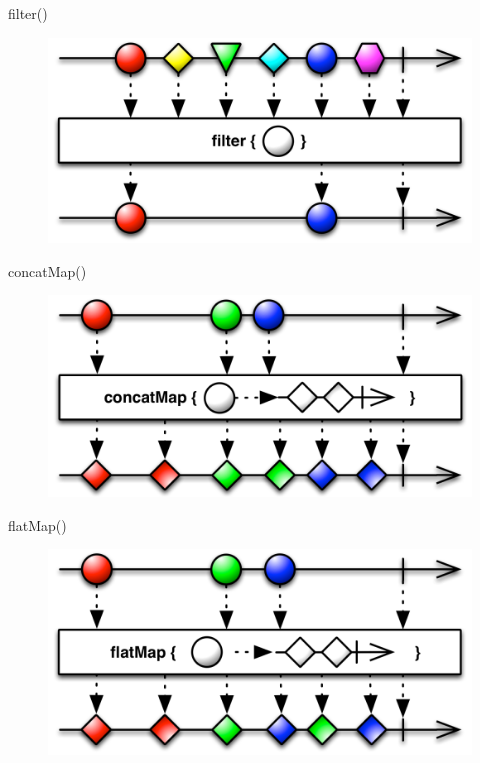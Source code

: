 \begin{frame}{filter()}
	\begin{figure}[h]
		\includegraphics[width=1.0\textwidth,page=1]{gfx/filter}
	\end{figure}
\end{frame}

\begin{frame}{concatMap()}
	\begin{figure}[h]
		\includegraphics[width=1.0\textwidth,page=1]{gfx/concatMap}
	\end{figure}
\end{frame}

\begin{frame}{flatMap()}
	\begin{figure}[h]
		\includegraphics[width=1.0\textwidth,page=1]{gfx/flatMap}
	\end{figure}
\end{frame}

